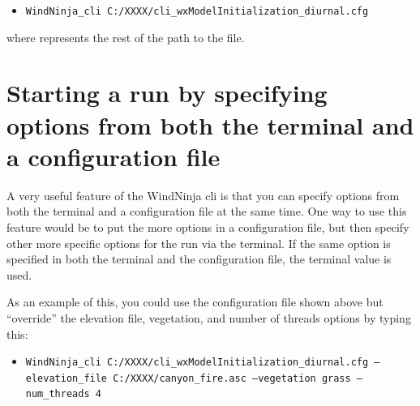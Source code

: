 \documentclass[12pt]{article}
\begin{document}
\begin{itemize}
\item[] \texttt{WindNinja\_cli C:/XXXX/cli\_wxModelInitialization\_diurnal.cfg}
\end{itemize}

where  represents the rest of the path to the file.

\section*{Starting a run by specifying options from both the terminal and a configuration file}

A very useful feature of the WindNinja cli is that you can specify options from both the terminal and a configuration file at the same time.  One way to use this feature would be to put the more  options in a configuration file, but then specify  other more specific options for the run via the terminal.  If the same option is specified in both the terminal and the configuration file, the terminal value is used.

As an example of this, you could use the configuration file shown above but “override” the elevation file, vegetation, and number of threads options by typing this:

\begin{itemize}
\item[] \texttt{WindNinja\_cli C:/XXXX/cli\_wxModelInitialization\_diurnal.cfg  --elevation\_file C:/XXXX/canyon\_fire.asc --vegetation grass --num\_threads 4}
\end{itemize}
\end{document}

